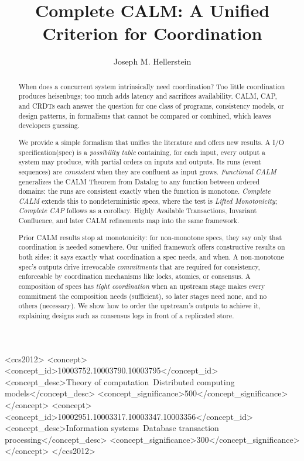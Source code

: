 \documentclass[sigconf]{cidr-2027}
\theoremstyle{remark}
\newcommand{\commitment}{commitment\xspace}
\newcommand{\commitments}{commitments\xspace}
\newcommand{\spectype}[1][]{I/O specification#1\xspace}
\begin{document}
\title{Complete CALM: A Unified Criterion for Coordination}

\author{Joseph M. Hellerstein}

\begin{abstract}
When does a concurrent system intrinsically need coordination?  Too little
coordination produces heisenbugs; too much adds latency and sacrifices
availability.  CALM, CAP, and CRDTs each answer the question for one class of
programs, consistency models, or design patterns, in formalisms that cannot be
compared or combined, which leaves developers guessing.

We provide a simple formalism that unifies the literature and
offers new results.  A \spectype (spec) is a \emph{possibility table} containing, for
each input, every output a system may produce, with partial orders on inputs and
outputs.  Its runs (event sequences) are \emph{consistent} when they are confluent as input grows.
\emph{Functional CALM} generalizes the CALM Theorem from Datalog to any function
between ordered domains: the runs are consistent exactly when the function is
monotone.  \emph{Complete CALM}
extends this to nondeterministic specs, where the test is
\emph{Lifted Monotonicity}; \emph{Complete CAP} follows as a corollary.
Highly Available Transactions, Invariant Confluence, and later CALM refinements
map into the same framework.

Prior CALM results stop at monotonicity: for non-monotone
specs, they say only that coordination is needed somewhere.  Our
unified framework offers constructive results on both sides: it says exactly
what coordination a spec needs, and when.  A non-monotone
spec's outputs drive irrevocable \emph{\commitments} that are required for consistency,
enforceable by coordination mechanisms like locks, atomics, or consensus.
A composition of specs has \emph{tight coordination} when an upstream stage makes every \commitment the composition needs (sufficient), so later stages need none, and no others (necessary).  We show how to order the upstream's outputs to achieve it, explaining designs such
as consensus logs in front of a replicated store.
\end{abstract}

\begin{CCSXML}
<ccs2012>
<concept>
<concept_id>10003752.10003790.10003795</concept_id>
<concept_desc>Theory of computation~Distributed computing models</concept_desc>
<concept_significance>500</concept_significance>
</concept>
<concept>
<concept_id>10002951.10003317.10003347.10003356</concept_id>
<concept_desc>Information systems~Database transaction processing</concept_desc>
<concept_significance>300</concept_significance>
</concept>
</ccs2012>
\end{CCSXML}
\end{document}
